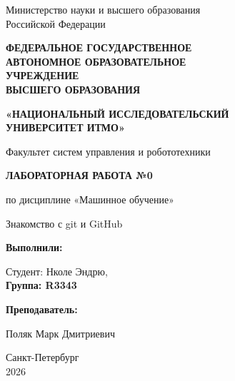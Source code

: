 \documentclass[a4paper,12pt]{article}
\begin{document}


\begin{center}

{\large
Министерство науки и высшего образования\\
Российской Федерации
}

\vspace{0.7cm}

{\large\bfseries
ФЕДЕРАЛЬНОЕ ГОСУДАРСТВЕННОЕ\\
АВТОНОМНОЕ ОБРАЗОВАТЕЛЬНОЕ\\
УЧРЕЖДЕНИЕ\\
ВЫСШЕГО ОБРАЗОВАНИЯ
}

\vspace{0.5cm}

{\large\bfseries
«НАЦИОНАЛЬНЫЙ ИССЛЕДОВАТЕЛЬСКИЙ\\
УНИВЕРСИТЕТ ИТМО»
}

\vspace{0.45cm}

{\normalsize
Факультет систем управления и робототехники
}

\vspace{2.8cm}

{\Large\bfseries
ЛАБОРАТОРНАЯ РАБОТА №0
}

\vspace{0.3cm}

{\normalsize
по дисциплине «Машинное обучение»
}

\vspace{0.8cm}

{\LARGE
Знакомство с git и GitHub
}

\vfill

\begin{flushright}
\begin{minipage}{0.43\textwidth}

\textbf{Выполнили:}

Студент: Нколе Эндрю,\\
\textbf{Группа: R3343}

\vspace{0.3cm}

\textbf{Преподаватель:}

 Поляк Марк Дмитриевич

\end{minipage}
\end{flushright}

\vfill

Санкт-Петербург\\
2026

\end{center}
\end{document}
